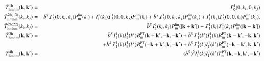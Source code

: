 \documentclass[onecolumn,notitlepage,showpacs,amsmath,amssymb,prd,floatfix]{revtex4-1}
\newcommand{\bk}{{\bf k}}
\newcommand{\bthmhm}{\bar{T}_{\rm hmhm}}
\newcommand{\pml}{P^{\rm lin}_{\rm m}}
\begin{document}
%
\begin{eqnarray}
 \bthmhm^{\rm 1h}(\bk,\bk')&=&{\cal I}^{4}_0(0,k_i,0,k_j)\nonumber\\
 \bthmhm^{\rm 2h(13)}(k_i,k_j)&=&\bar{b}^S{\cal
 I}^1_{3}(0,k_i,k_j)\pml(k_i)
 +I^1_1(k_i){\cal I}^1_3(0,0,k_j)\pml(k_i)
 +\bar{b}^S{\cal I}^1_3(0,k_i,k_j)\pml(k_j)
 +I^1_1(k_j){\cal I}^1_3(0,0,k_i)\pml(k_j),\nonumber\\
 \bthmhm^{\rm 2h(22)}(k_i,k_j)&=&\bar{b}^SI^1_2(k_i,k_j)\pml(|\bk+\bk'|)
 +{\cal I}^1_1(k_i){\cal I}^1_1(k_j)\pml(|\bk-\bk'|)\nonumber\\
 \bthmhm^{\rm 3h}(\bk,\bk')&=&
 \bar{b}^SI^1_1(k)I^1_1(k')B^{\rm PT}_{\rm m}(\bk+\bk',-\bk,-\bk')
 +\bar{b}^S{\cal I}^1_1(k')I^1_1(k)B^{\rm PT}_{\rm m}(\bk-\bk',-\bk,\bk')\nonumber\\
&& +\bar{b}^S{\cal I}^1_1(k)I^1_1(k')B^{\rm PT}_{\rm m}(-\bk+\bk',\bk,-\bk')
 +\bar{b}^S{\cal I}^1_1(k)I^1_1(k')B^{\rm PT}_{\rm
 m}(-\bk-\bk',\bk,\bk')\nonumber\\
 \bthmhm^{\rm 4h}(\bk,\bk')&=&(\bar{b}^S)^2I^1_1(k)I^1_1(k')T^{\rm PT}_m(\bk,-\bk,\bk',-\bk')
\end{eqnarray}
\end{document}

